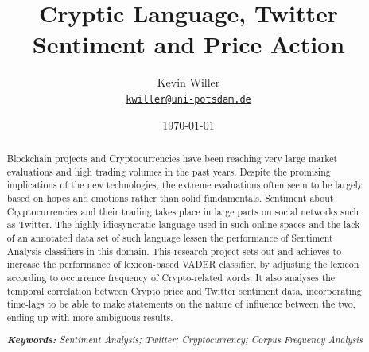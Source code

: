 \documentclass[11pt]{article}
\title{Cryptic Language, Twitter Sentiment and Price Action}
\author{Kevin Willer\\%
    \href{mailto:kwiller@uni-potsdam.de}{\texttt{kwiller@uni-potsdam.de}} %
    }
\date{\today}
\begin{document}
{
\maketitle
\begin{abstract}

Blockchain projects and Cryptocurrencies have been reaching very large market evaluations and high trading volumes in the past years. Despite the promising implications of the new technologies, the extreme evaluations often seem to be largely based on hopes and emotions rather than solid fundamentals. Sentiment about Cryptocurrencies and their trading takes place in large parts on social networks such as Twitter. The highly idiosyncratic language used in such online spaces and the lack of an annotated data set of such language lessen the performance of Sentiment Analysis classifiers in this domain. This research project sets out and achieves to increase the performance of lexicon-based VADER classifier, by adjusting the lexicon according to occurrence frequency of Crypto-related words. It also analyses the temporal correlation between Crypto price and Twitter sentiment data, incorporating time-lags to be able to make statements on the nature of influence between the two, ending up with more ambiguous results. 

\noindent
\textit{\textbf{Keywords: }%
Sentiment Analysis; Twitter; Cryptocurrency; Corpus Frequency Analysis} \\ %
\noindent

\end{abstract}
}
\clearpage
\tableofcontents
\clearpage
\end{document}
